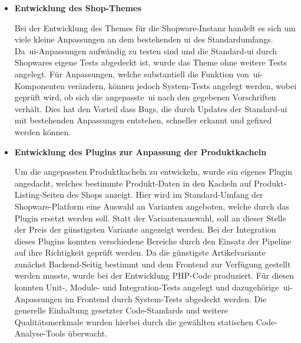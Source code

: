 \begin{itemize}
    \item {
        \textbf{Entwicklung des Shop-Themes}\par
        Bei der Entwicklung des Themes für die Shopware-Instanz handelt es sich um viele kleine Anpassungen an dem
        bestehenden \acrfull{ui} des Standardumfangs.
        Da\ \acrshort{ui}-Anpassungen aufwändig zu testen sind und die Standard-\acrshort{ui} durch
        Shopwares eigene Tests abgedeckt ist, wurde das Theme ohne weitere Tests angelegt.
        Für Anpassungen, welche substantiell die Funktion von\ \acrshort{ui}-Komponenten verändern, können jedoch
        System-Tests angelegt werden, wobei geprüft wird, ob sich die angepasste\ \acrshort{ui} nach den gegebenen
        Vorschriften verhält.
        Dies hat den Vorteil dass Bugs, die durch Updates der Standard-\acrshort{ui} mit bestehenden Anpassungen
        entstehen, schneller erkannt und gefixed werden können.
    }

    \item {
        \textbf{Entwicklung des Plugins zur Anpassung der Produktkacheln}\par
        Um die angepassten Produktkacheln zu entwickeln, wurde ein eigenes Plugin angedacht, welches bestimmte
        Produkt-Daten in den Kacheln auf Produkt-Listing-Seiten des Shops anzeigt.
        Hier wird im Standard-Umfang der Shopware-Platform eine Auswahl an Varianten angeboten, welche durch das
        Plugin ersetzt werden soll.
        Statt der Variantenauswahl, soll an dieser Stelle der Preis der günstigsten Variante angezeigt werden.
        Bei der Integration dieses Plugins konnten verschiedene Bereiche durch den Einsatz der Pipeline auf ihre
        Richtigkeit geprüft werden.
        Da die günstigste Artikelvariante zunächst Backend-Seitig bestimmt und dem Frontend zur Verfügung
        gestellt werden musste, wurde bei der Entwicklung PHP-Code produziert.
        Für diesen konnten Unit-, Module- und Integration-Tests angelegt und dazugehörige\ \acrshort{ui}-Anpassungen
        im Frontend durch System-Tests abgedeckt werden.
        Die generelle Einhaltung gesetzter Code-Standards und weitere Qualitätsmerkmale wurden hierbei durch die
        gewählten statischen Code-Analyse-Tools überwacht.
    }


\end{itemize}
